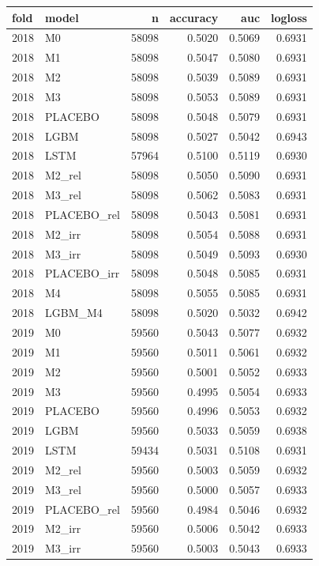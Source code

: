 \begin{tabular}{llrrrr}
\toprule
fold & model & n & accuracy & auc & logloss \\
\midrule
2018 & M0 & 58098 & 0.5020 & 0.5069 & 0.6931 \\
2018 & M1 & 58098 & 0.5047 & 0.5080 & 0.6931 \\
2018 & M2 & 58098 & 0.5039 & 0.5089 & 0.6931 \\
2018 & M3 & 58098 & 0.5053 & 0.5089 & 0.6931 \\
2018 & PLACEBO & 58098 & 0.5048 & 0.5079 & 0.6931 \\
2018 & LGBM & 58098 & 0.5027 & 0.5042 & 0.6943 \\
2018 & LSTM & 57964 & 0.5100 & 0.5119 & 0.6930 \\
2018 & M2\_rel & 58098 & 0.5050 & 0.5090 & 0.6931 \\
2018 & M3\_rel & 58098 & 0.5062 & 0.5083 & 0.6931 \\
2018 & PLACEBO\_rel & 58098 & 0.5043 & 0.5081 & 0.6931 \\
2018 & M2\_irr & 58098 & 0.5054 & 0.5088 & 0.6931 \\
2018 & M3\_irr & 58098 & 0.5049 & 0.5093 & 0.6930 \\
2018 & PLACEBO\_irr & 58098 & 0.5048 & 0.5085 & 0.6931 \\
2018 & M4 & 58098 & 0.5055 & 0.5085 & 0.6931 \\
2018 & LGBM\_M4 & 58098 & 0.5020 & 0.5032 & 0.6942 \\
2019 & M0 & 59560 & 0.5043 & 0.5077 & 0.6932 \\
2019 & M1 & 59560 & 0.5011 & 0.5061 & 0.6932 \\
2019 & M2 & 59560 & 0.5001 & 0.5052 & 0.6933 \\
2019 & M3 & 59560 & 0.4995 & 0.5054 & 0.6933 \\
2019 & PLACEBO & 59560 & 0.4996 & 0.5053 & 0.6932 \\
2019 & LGBM & 59560 & 0.5033 & 0.5059 & 0.6938 \\
2019 & LSTM & 59434 & 0.5031 & 0.5108 & 0.6931 \\
2019 & M2\_rel & 59560 & 0.5003 & 0.5059 & 0.6932 \\
2019 & M3\_rel & 59560 & 0.5000 & 0.5057 & 0.6933 \\
2019 & PLACEBO\_rel & 59560 & 0.4984 & 0.5046 & 0.6932 \\
2019 & M2\_irr & 59560 & 0.5006 & 0.5042 & 0.6933 \\
2019 & M3\_irr & 59560 & 0.5003 & 0.5043 & 0.6933 \\

\end{tabular}

